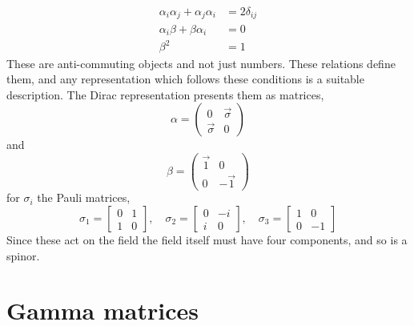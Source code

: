 \begin{subequations}
\begin{align}
  \label{eq:79}
  \alpha_i \alpha_j + \alpha_j \alpha_i &= 2 \delta_{ij} \\
\alpha_i \beta + \beta \alpha_i &= 0 \\
\beta^2 &= 1
\end{align}
\end{subequations}
These are anti-commuting objects and not just numbers. These relations
define them, and any representation which follows these conditions is
a suitable description. The Dirac representation presents them as
matrices,
\begin{equation}
  \label{eq:80}
  \alpha =
  \begin{pmatrix}
    0 & \vec{\sigma} \\ \vec{\sigma} & 0
  \end{pmatrix}
\end{equation}
and 
\begin{equation}
  \label{eq:81}
  \beta =
  \begin{pmatrix}
    \vec{1} & 0 \\ 0 & - \vec{1}
  \end{pmatrix}
\end{equation}
for $\sigma_i$ the Pauli matrices,
\begin{equation}
  \label{eq:82}
  \sigma_1 =  \begin{bmatrix}     0 & 1 \\ 1 & 0   \end{bmatrix}, \quad
\sigma_2 =    \begin{bmatrix}     0 & -i \\ i & 0  \end{bmatrix}, \quad
\sigma_3 =    \begin{bmatrix}     1 & 0  \\ 0 & -1 \end{bmatrix}
\end{equation}
Since these act on the field the field itself must have four
components, and so is a spinor.

\section{Gamma matrices}
\label{sec:gamma-matrices}

